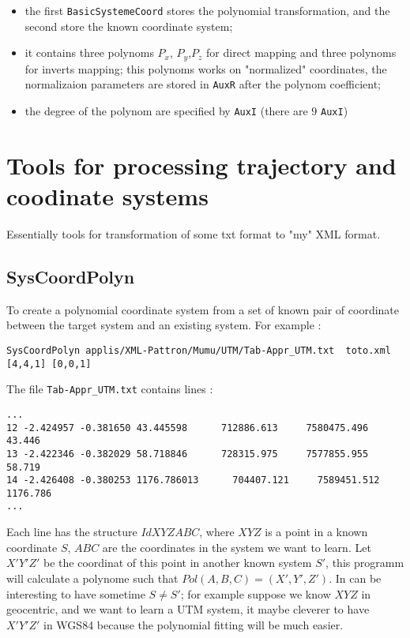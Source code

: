 \begin{itemize}
   \item  the first {\tt BasicSystemeCoord} stores the polynomial transformation, and the
          second store the known coordinate system;

   \item  it contains three polynoms $P_x$, $P_y$,$P_z$ for direct mapping
          and three polynoms for inverts mapping; this polynoms works on "normalized"
          coordinates,  the normalizaion parameters are stored in {\tt AuxR}
          after the polynom coefficient;

   \item  the degree of the polynom are specified by {\tt AuxI} (there are $9$ {\tt AuxI})
    
\end{itemize}


\section{Tools for processing trajectory and coodinate systems}

Essentially tools for transformation of some txt format to "my" XML format.

\subsection{SysCoordPolyn}


To create a polynomial coordinate system from a set of known pair of coordinate
between the target system and an existing system. For example :

\begin{verbatim}
SysCoordPolyn applis/XML-Pattron/Mumu/UTM/Tab-Appr_UTM.txt  toto.xml [4,4,1] [0,0,1]
\end{verbatim}

The file {\tt Tab-Appr\_UTM.txt} contains lines :


\begin{verbatim}
...
12 -2.424957 -0.381650 43.445598      712886.613     7580475.496         43.446
13 -2.422346 -0.382029 58.718846      728315.975     7577855.955         58.719
14 -2.426408 -0.380253 1176.786013      704407.121     7589451.512       1176.786
...
\end{verbatim}

Each line has the structure $Id X Y Z A B C$, where $X Y Z$ is a point
in a known coordinate  $S$,  $A B C$ are the coordinates in the system we want to
learn.  Let $X' Y' Z'$ be the coordinat of this point in another known system $S'$, this programm will
calculate a polynome such that $Pol(A,B,C)=(X',Y',Z')$. In can be interesting to have
sometime $S \neq S'$; for example suppose we know $X Y Z$ in geocentric,
and we want to learn a UTM system, it maybe cleverer to have $X' Y' Z'$ in WGS84
because the polynomial fitting will be much easier.

